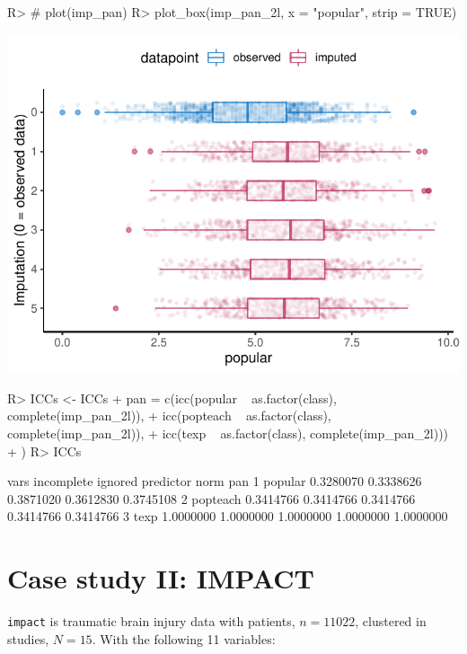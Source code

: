 \documentclass[
]{jss}
\begin{document}
\begin{CodeChunk}
\begin{CodeInput}
R> # plot(imp_pan)
R> plot_box(imp_pan_2l, x = "popular", strip = TRUE)
\end{CodeInput}


\begin{center}\includegraphics{Manuscript_files/figure-latex/pop_pan_eval-1} \end{center}

\begin{CodeInput}
R> ICCs <- ICCs %
+            pan = c(icc(popular ~ as.factor(class), complete(imp_pan_2l)), 
+                     icc(popteach ~ as.factor(class), complete(imp_pan_2l)), 
+                     icc(texp ~ as.factor(class), complete(imp_pan_2l)))
+            )
R> ICCs
\end{CodeInput}
\begin{CodeOutput}
      vars incomplete   ignored predictor      norm       pan
1  popular  0.3280070 0.3338626 0.3871020 0.3612830 0.3745108
2 popteach  0.3414766 0.3414766 0.3414766 0.3414766 0.3414766
3     texp  1.0000000 1.0000000 1.0000000 1.0000000 1.0000000
\end{CodeOutput}
\end{CodeChunk}

\hypertarget{case-study-ii-impact}{%
\section{Case study II: IMPACT}\label{case-study-ii-impact}}

\texttt{impact} is traumatic brain injury data with patients,
\(n = 11022\), clustered in studies, \(N = 15\). With the following 11
variables:
\end{document}
